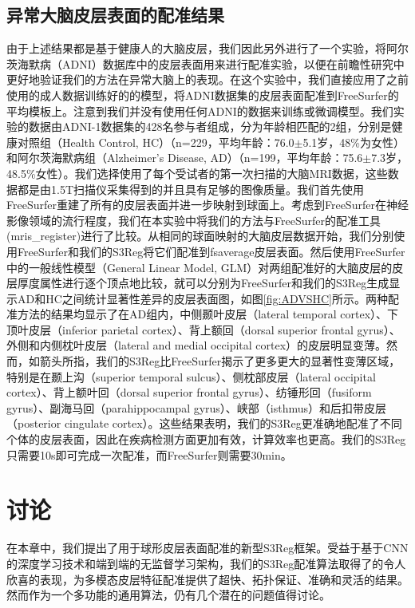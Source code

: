 \subsection{异常大脑皮层表面的配准结果}
由于上述结果都是基于健康人的大脑皮层，我们因此另外进行了一个实验，将阿尔茨海默病（ADNI）数据库\cite{jack2008alzheimer}中的皮层表面用来进行配准实验，以便在前瞻性研究中更好地验证我们的方法在异常大脑上的表现。在这个实验中，我们直接应用了之前使用的成人数据训练好的的模型，将ADNI数据集的皮层表面配准到FreeSurfer的平均模板上。注意到我们并没有使用任何ADNI的数据来训练或微调模型。我们实验的数据由ADNI-1数据集的428名参与者组成，分为年龄相匹配的2组，分别是健康对照组（Health Control, HC）（n=229，平均年龄：76.0$\pm$5.1岁，48\%为女性）和阿尔茨海默病组（Alzheimer's Disease, AD）（n=199，平均年龄：75.6$\pm$7.3岁，48.5\%女性）。我们选择使用了每个受试者的第一次扫描的大脑MRI数据，这些数据都是由1.5T扫描仪采集得到的并且具有足够的图像质量。我们首先使用FreeSurfer重建了所有的皮层表面\cite{fischl2012freesurfer}并进一步映射到球面上。考虑到FreeSurfer在神经影像领域的流行程度，我们在本实验中将我们的方法与FreeSurfer的配准工具(mris\_register)进行了比较。从相同的球面映射的大脑皮层数据开始，我们分别使用FreeSurfer和我们的S3Reg将它们配准到fsaverage皮层表面\cite{fischl2012freesurfer}。然后使用FreeSurfer中的一般线性模型（General Linear Model, GLM）对两组配准好的大脑皮层的皮层厚度属性进行逐个顶点地比较，就可以分别为FreeSurfer和我们的S3Reg生成显示AD和HC之间统计显著性差异的皮层表面图，如图\ref{fig:ADVSHC}所示。两种配准方法的结果均显示了在AD组内，中侧颞叶皮层（lateral temporal cortex）、下顶叶皮层（inferior parietal cortex）、背上额回（dorsal superior frontal gyrus）、外侧和内侧枕叶皮层（lateral and medial occipital cortex）的皮层明显变薄。然而，如箭头所指，我们的S3Reg比FreeSurfer揭示了更多更大的显著性变薄区域，特别是在颞上沟（superior temporal sulcus）、侧枕部皮层（lateral occipital cortex）、背上额叶回（dorsal superior frontal gyrus）、纺锤形回（fusiform gyrus）、副海马回（parahippocampal gyrus）、峡部（isthmus）和后扣带皮层（posterior cingulate cortex）。这些结果表明，我们的S3Reg更准确地配准了不同个体的皮层表面，因此在疾病检测方面更加有效，计算效率也更高。我们的S3Reg只需要10s即可完成一次配准，而FreeSurfer则需要30min。

\section{讨论}
在本章中，我们提出了用于球形皮层表面配准的新型S3Reg框架。受益于基于CNN的深度学习技术和端到端的无监督学习架构，我们的S3Reg配准算法取得了的令人欣喜的表现，为多模态皮层特征配准提供了超快、拓扑保证、准确和灵活的结果。然而作为一个多功能的通用算法，仍有几个潜在的问题值得讨论。

